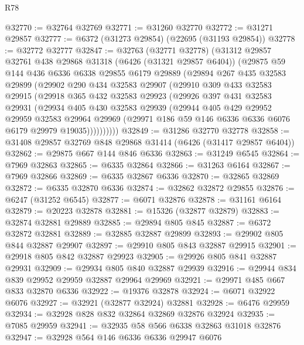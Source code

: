 \begin{lexlean}{R78}
\begin{coremodule}
@32770 := @32764 @32769
@32771 := @31260 @32770
@32772 := @31271 @29857
@32777 := @6372 (@31273 @29854) (@22695 (@31193 @29854))
@32778 := @32772 @32777
@32847 := @32763
    (@32771 @32778)
    (@31312
      @29857
      @32761
      @438
      @29868
      @31318
      (@6426 (@31321 @29857 @6404))
      (@29875
        @59
        @144
        @436
        @6336
        @6338
        @29855
        @6179
        @29889
        (@29894
          @267
          @435
          @32583
          @29899
          (@29902
            @290
            @434
            @32583
            @29907
            (@29910
              @309
              @433
              @32583
              @29915
              (@29918
                @365
                @432
                @32583
                @29923
                (@29926
                  @397
                  @431
                  @32583
                  @29931
                  (@29934
                    @405
                    @430
                    @32583
                    @29939
                    (@29944
                      @405
                      @429
                      @29952
                      @29959
                      @32583
                      @29964
                      @29969
                      (@29971 @186 @59 @146 @6336 @6336 @6076 @6179 @29979 @19035))))))))))
@32849 := @31286 @32770 @32778
@32858 := @31408 @29857 @32769 @848 @29868 @31414 (@6426 (@31417 @29857 @6404))
@32862 := @29875 @667 @144 @846 @6336
@32863 := @31249 @6545
@32864 := @7969 @32863
@32865 := @6335 @32864
@32866 := @31263 @6164
@32867 := @7969 @32866
@32869 := @6335 @32867 @6336
@32870 := @32865 @32869
@32872 := @6335 @32870 @6336
@32874 := @32862 @32872 @29855
@32876 := @6247 (@31252 @6545)
@32877 := @6071 @32876
@32878 := @31161 @6164
@32879 := @20223 @32878
@32881 := @15326 (@32877 @32879)
@32883 := @32874 @32881 @29889
@32885 := @29894 @805 @845
@32887 := @6372 @32872 @32881
@32889 := @32885 @32887 @29899
@32893 := @29902 @805 @844 @32887 @29907
@32897 := @29910 @805 @843 @32887 @29915
@32901 := @29918 @805 @842 @32887 @29923
@32905 := @29926 @805 @841 @32887 @29931
@32909 := @29934 @805 @840 @32887 @29939
@32916 := @29944 @834 @839 @29952 @29959 @32887 @29964 @29969
@32921 := @29971 @485 @667 @833 @32870 @6336
@32922 := @19376 @32878
@32924 := @6071 @32922 @6076
@32927 := @32921 (@32877 @32924) @32881
@32928 := @6476 @29959
@32934 := @32928 @828 @832 @32864 @32869 @32876 @32924
@32935 := @7085 @29959
@32941 := @32935 @58 @566 @6338 @32863 @31018 @32876
@32947 := @32928 @564 @146 @6336 @6336 @29947 @6076

\end{coremodule}
\end{lexlean}
